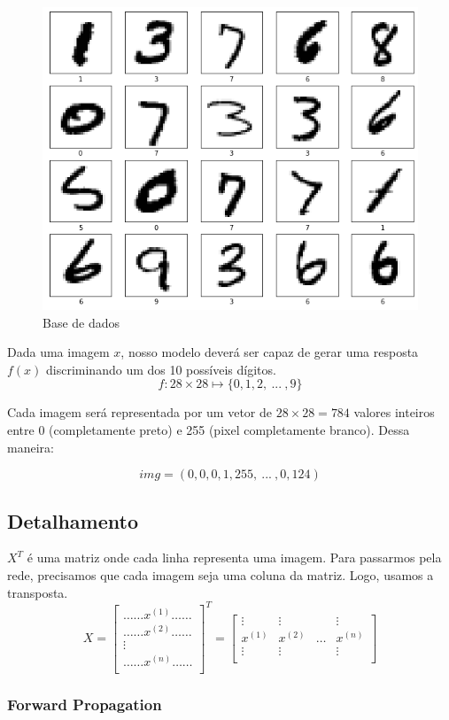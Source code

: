 \begin{figure}[h!]
	\centering
	\includegraphics[width=0.4\linewidth]{imagens/mnist}
	\caption{Base de dados}
	\label{fig:mnist}
\end{figure}

Dada uma imagem $x$, nosso modelo deverá ser capaz de gerar uma resposta $f(x)$ discriminando um dos 10 possíveis dígitos.
$$f: 28 \times 28 \mapsto \{0, 1, 2, \ ... \ , 9\}$$

Cada imagem será representada por um vetor de $28 \times 28 = 784$ valores inteiros entre 0 (completamente preto) e 255 (pixel completamente branco).  Dessa maneira:

$$img = (0, 0, 0, 1, 255, \ ... \ , 0, 124)$$

\subsection{Detalhamento}
$X^T$ é uma matriz onde cada linha representa uma imagem. Para passarmos pela rede, precisamos que cada imagem seja uma coluna da matriz. Logo, usamos a transposta. 
$$X = \begin{bmatrix}
		\ldots\ldots  x^{(1)}  \ldots\ldots \\
		\ldots\ldots  x^{(2)} \ldots\ldots \\
		\vdots  \\
		\ldots\ldots  x^{(n)}  \ldots\ldots \\
	  \end{bmatrix} ^T 
	  =
	  \begin{bmatrix}
	  	\vdots & \vdots &  & \vdots \\
	  	x^{(1)} & x^{(2)} & \ldots & x^{(n)} \\
	  	\vdots & \vdots &  & \vdots \\
	  \end{bmatrix}
	  $$

\subsubsection{Forward Propagation}

